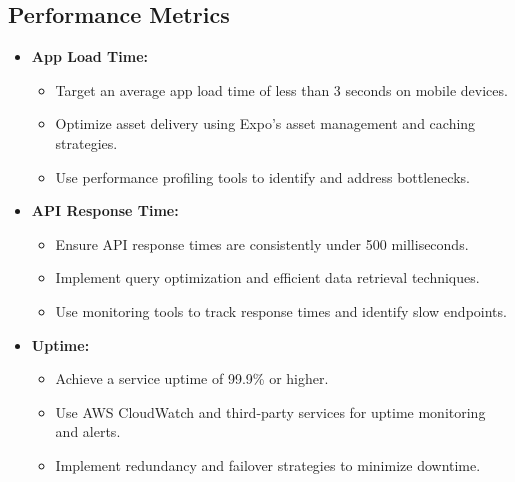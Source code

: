 \subsection{Performance Metrics}
\begin{itemize}[leftmargin=*]
    \item \textbf{App Load Time:}
    \begin{itemize}
        \item Target an average app load time of less than 3 seconds on mobile devices.
        \item Optimize asset delivery using Expo's asset management and caching strategies.
        \item Use performance profiling tools to identify and address bottlenecks.
    \end{itemize}
    
    \item \textbf{API Response Time:}
    \begin{itemize}
        \item Ensure API response times are consistently under 500 milliseconds.
        \item Implement query optimization and efficient data retrieval techniques.
        \item Use monitoring tools to track response times and identify slow endpoints.
    \end{itemize}
    
    \item \textbf{Uptime:}
    \begin{itemize}
        \item Achieve a service uptime of 99.9\% or higher.
        \item Use AWS CloudWatch and third-party services for uptime monitoring and alerts.
        \item Implement redundancy and failover strategies to minimize downtime.
    \end{itemize}
\end{itemize}

